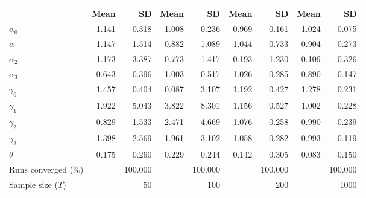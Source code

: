 
\begin{tabular}[t]{lrrrrrrrr}
\toprule
  & Mean & SD & Mean  & SD  & Mean   & SD   & Mean    & SD   \\
\midrule
$\alpha_{0}$ & 1.141 & 0.318 & 1.008 & 0.236 & 0.969 & 0.161 & 1.024 & 0.075\\
$\alpha_{1}$ & 1.147 & 1.514 & 0.882 & 1.089 & 1.044 & 0.733 & 0.904 & 0.273\\
$\alpha_{2}$ & -1.173 & 3.387 & 0.773 & 1.417 & -0.193 & 1.230 & 0.109 & 0.326\\
$\alpha_{3}$ & 0.643 & 0.396 & 1.003 & 0.517 & 1.026 & 0.285 & 0.890 & 0.147\\
$\gamma_{0}$ & 1.457 & 0.404 & 0.087 & 3.107 & 1.192 & 0.427 & 1.278 & 0.231\\
$\gamma_{1}$ & 1.922 & 5.043 & 3.822 & 8.301 & 1.156 & 0.527 & 1.002 & 0.228\\
$\gamma_{2}$ & 0.829 & 1.533 & 2.471 & 4.669 & 1.076 & 0.258 & 0.990 & 0.239\\
$\gamma_{3}$ & 1.398 & 2.569 & 1.961 & 3.102 & 1.058 & 0.282 & 0.993 & 0.119\\
$\theta$ & 0.175 & 0.260 & 0.229 & 0.244 & 0.142 & 0.305 & 0.083 & 0.150\\
Runs converged (\%) &  & 100.000 &  & 100.000 &  & 100.000 &  & 100.000\\
Sample size ($T$) &  & 50 &  & 100 &  & 200 &  & 1000\\
\bottomrule
\end{tabular}
